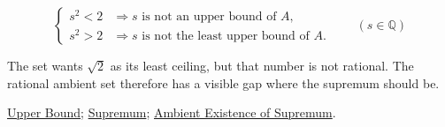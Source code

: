 \begin{remark*}
\[
\begin{cases}
s^2<2 &\Longrightarrow s\text{ is not an upper bound of }A,\\
s^2>2 &\Longrightarrow s\text{ is not the least upper bound of }A.
\end{cases}
\qquad(s\in\mathbb{Q})
\]
\end{remark*}

\begin{remark*}[Interpretation]
The set wants $\sqrt{2}$ as its least ceiling, but that number is not rational. The rational ambient set therefore has a visible gap where the supremum should be.
\end{remark*}

\begin{remark*}[Dependencies]
\hyperref[def:upper-bound]{Upper Bound};
\hyperref[def:supremum]{Supremum};
\hyperref[thm:ambient-existence-supremum]{Ambient Existence of Supremum}.
\end{remark*}
























